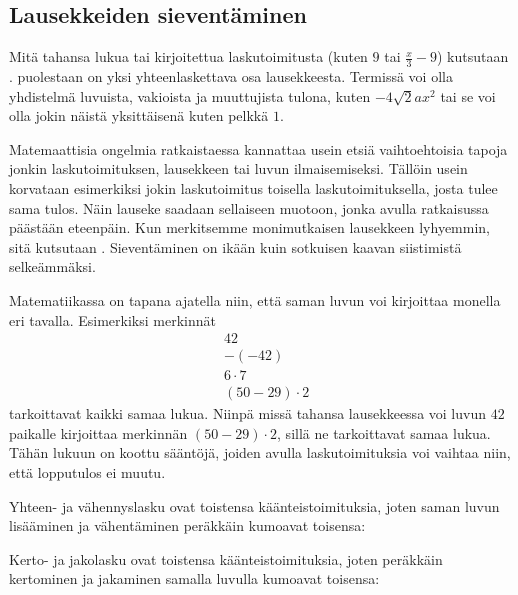\subsection*{Lausekkeiden sieventäminen}

Mitä tahansa lukua tai kirjoitettua laskutoimitusta (kuten $9$ tai $\frac{x}{3}-9$) kutsutaan .  puolestaan on yksi yhteenlaskettava osa lausekkeesta. Termissä voi olla yhdistelmä luvuista, vakioista ja muuttujista tulona, kuten $-4\sqrt{2}ax^2$ tai se voi olla jokin näistä yksittäisenä kuten pelkkä $1$.

Matemaattisia ongelmia ratkaistaessa kannattaa usein etsiä vaihtoehtoisia tapoja jonkin laskutoimituksen, lausekkeen tai luvun ilmaisemiseksi. Tällöin usein korvataan esimerkiksi jokin laskutoimitus toisella laskutoimituksella, josta tulee sama tulos. Näin lauseke saadaan sellaiseen muotoon, jonka avulla ratkaisussa päästään eteenpäin. Kun merkitsemme monimutkaisen lausekkeen lyhyemmin, sitä kutsutaan . Sieventäminen on ikään kuin sotkuisen kaavan siistimistä selkeämmäksi.

Matematiikassa on tapana ajatella niin, että saman luvun voi kirjoittaa monella eri tavalla. Esimerkiksi merkinnät \begin{align*}
                & 42 \\ & -(-42) \\ & 6 \cdot 7 \\ & (50-29) \cdot 2                                                                                                      
                                                                                                                 \end{align*}
tarkoittavat kaikki samaa lukua. Niinpä missä tahansa lausekkeessa voi luvun $42$ paikalle kirjoittaa merkinnän $(50-29)\cdot 2$, sillä ne tarkoittavat samaa lukua. Tähän lukuun on koottu sääntöjä, joiden avulla laskutoimituksia voi vaihtaa niin, että lopputulos ei muutu.

Yhteen- ja vähennyslasku ovat toistensa käänteistoimituksia, joten saman luvun lisääminen ja vähentäminen peräkkäin kumoavat toisensa:


Kerto- ja jakolasku ovat toistensa käänteistoimituksia, joten peräkkäin kertominen ja jakaminen samalla luvulla kumoavat toisensa:

